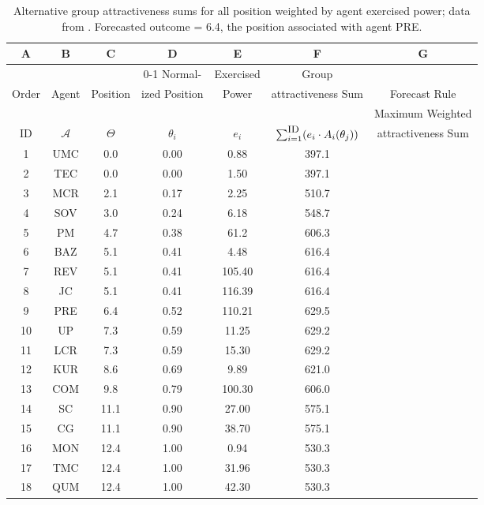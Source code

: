 
\begin{table}[h]
\centering
\begin{tabular}{ccccccc}
\hline
A & \multicolumn{1}{c}{B} & \multicolumn{1}{c}{C} & D & \multicolumn{1}{c}{E} & \multicolumn{1}{c}{F} & G \\ \hline
 & & & \multicolumn{1}{c}{0-1 Normal-} &  \multicolumn{1}{c}{Exercised} & \multicolumn{1}{c}{Group} & \\
Order & Agent &	 Position %
& \multicolumn{1}{c}{ized Position} %
&  \multicolumn{1}{c}{Power} & \multicolumn{1}{c}{  {attractiveness} Sum} &  Forecast Rule %
\\
\hline
& & & & & & Maximum Weighted \\
ID & \multicolumn{1}{c}{$\mathcal{A}$} & \multicolumn{1}{c}{$\Theta$} & \multicolumn{1}{c}{$\theta_i$} & \multicolumn{1}{c}{$e_i$} & $\sum_{i=1}^{\mbox{\small ID}} (e_i\cdot A_i(\theta_j))$ &   {attractiveness} Sum \\[3pt]
\hline\hline
1 & UMC & 	0.0	& 0.00	 & 0.88 & 397.1 & \\
2 & TEC	& 0.0	& 0.00 & 1.50 & 397.1 & \\
3 & MCR	 & 2.1 & 0.17 	& 2.25 & 510.7 &  \\
4 & SOV	& 3.0 & 0.24	 & 6.18 & 548.7 &  \\
5 & PM & 4.7 & 0.38	& 61.2 & 606.3 & \\
6 & BAZ	& 5.1  &	0.41 & 4.48 & 	616.4 & \\
7 & REV	& 5.1	 & 0.41 & 105.40 &	616.4 & \\
8 & JC	& 5.1 & 	0.41	& 116.39 & 616.4 & \\
9 & PRE &	6.4	& 0.52	& 110.21 & 629.5 & \ding{52} \\
10 & UP	& 7.3 & 	0.59	& 11.25 & 629.2 & \\
11 & LCR	& 7.3	 &  0.59 & 15.30 & 629.2 &  \\
12 & KUR &	8.6	& 0.69 & 9.89 & 621.0 & \\
13 & COM	 & 9.8 &	0.79	& 100.30 & 606.0  & \\
14 & SC &	11.1	& 0.90	& 27.00 & 575.1 & \\  %
15 & CG	& 11.1 &	0.90 & 38.70 &	575.1 & \\
16 & MON	 & 12.4 &	1.00	& 0.94 & 530.3 & \\
17 & TMC	 & 12.4	& 1.00 & 31.96 &	530.3 & \\
18 & QUM	 & 12.4 &	1.00 & 42.30 & 	530.3 & \\
\hline
\end{tabular}
\caption{Alternative group   {attractiveness} sums for all   {position} weighted by agent   {exercised power}; data from \cite[Tables 1 and 2]{mesquita_1984}. Forecasted outcome = 6.4, the   {position} associated with agent PRE.}
\label{table:weighted_range_scores_2}
\end{table}


